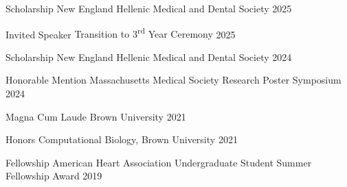

\begin{cvhonors}

  \cvhonor
    {Scholarship} %
    {New England Hellenic Medical and Dental Society} %
    {2025} %

  \cvhonor
    {Invited Speaker} %
    {Transition to 3\textsuperscript{rd} Year Ceremony} %
    {2025} %

  \cvhonor
    {Scholarship} %
    {New England Hellenic Medical and Dental Society} %
    {2024} %

  \cvhonor
    {Honorable Mention} %
    {Massachusetts Medical Society Research Poster Symposium} %
    {2024} %

  \cvhonor
    {Magna Cum Laude} %
    {Brown University} %
    {2021} %

  \cvhonor
    {Honors} %
    {Computational Biology, Brown University} %
    {2021} %

  \cvhonor
    {Fellowship} %
    {American Heart Association Undergraduate Student Summer Fellowship Award} %
    {2019} %

\end{cvhonors}
